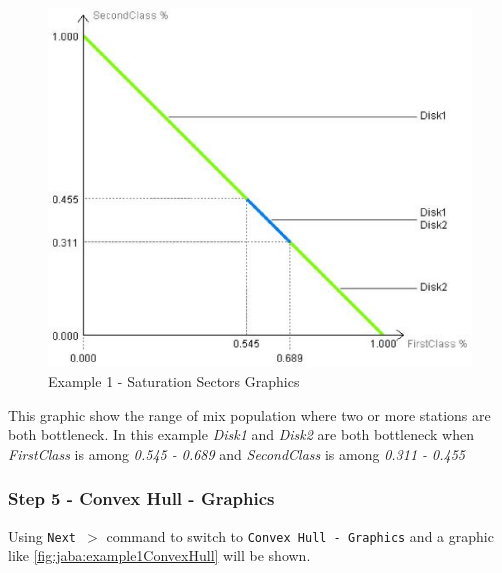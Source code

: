 \begin{figure}[htbp]
    \begin{center}
        \includegraphics[scale=.5]{img/jaba/example1SatSector}
    \end{center}
    \caption{Example 1 - Saturation Sectors Graphics}
    \label{fig:jaba:example1SatSector}
\end{figure}

This graphic show the range of mix population where two or more stations are both bottleneck.
In this example \textit{Disk1} and \textit{Disk2} are both bottleneck when \textit{FirstClass} is among
\textit{0.545 - 0.689} and \textit{SecondClass} is among \textit{0.311 - 0.455}

\subsubsection{Step 5 - Convex Hull - Graphics}
Using \texttt{Next $>$} command to switch to \texttt{Convex Hull - Graphics} and a graphic like \autoref{fig:jaba:example1ConvexHull} will be shown.

